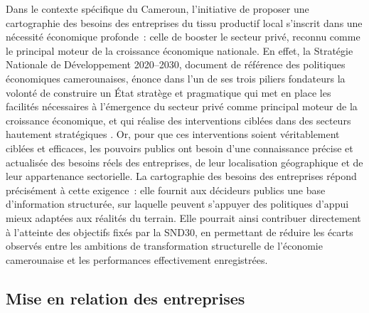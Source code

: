 \documentclass[12pt, a4paper, oneside]{report}
\begin{document}
	Dans le contexte spécifique du Cameroun, l'initiative de proposer une cartographie des besoins des entreprises du tissu productif local s'inscrit dans une nécessité économique profonde~: celle de booster le secteur privé, reconnu comme le principal moteur de la croissance économique nationale. En effet, la Stratégie Nationale de Développement 2020--2030, document de référence des politiques économiques camerounaises, énonce dans l'un de ses trois piliers fondateurs la volonté de construire un État stratège et pragmatique qui met en place les facilités nécessaires à l'émergence du secteur privé comme principal moteur de la croissance économique, et qui réalise des interventions ciblées dans des secteurs hautement stratégiques \cite{minepat2020}. Or, pour que ces interventions soient véritablement ciblées et efficaces, les pouvoirs publics ont besoin d'une connaissance précise et actualisée des besoins réels des entreprises, de leur localisation géographique et de leur appartenance sectorielle. La cartographie des besoins des entreprises répond précisément à cette exigence~: elle fournit aux décideurs publics une base d'information structurée, sur laquelle peuvent s'appuyer des politiques d'appui mieux adaptées aux réalités du terrain. Elle pourrait ainsi contribuer directement à l'atteinte des objectifs fixés par la SND30, en permettant de réduire les écarts observés entre les ambitions de transformation structurelle de l'économie camerounaise et les performances effectivement enregistrées.
	
	
	\subsection{Mise en relation des entreprises}
	
\end{document}
